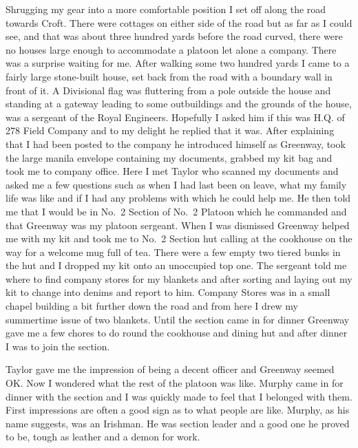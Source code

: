Shrugging my gear into a more comfortable position I set off along the
road towards Croft. There were cottages on either side of the road
but as far as I could see, and that was about three hundred yards
before the road curved, there were no houses large enough to accommodate
a platoon let alone a company. There was a surprise waiting for me.
After walking some two hundred yards I came to a fairly large
stone-built house, set back from the road with a boundary wall in front
of it. A Divisional flag was fluttering from a pole outside the house
and standing at a gateway leading to some outbuildings and the grounds
of the house, was a sergeant of the Royal Engineers. Hopefully I
asked him if this was H.Q. of 278 Field Company and to my delight he
replied that it was. After explaining that I had been posted to the
company he introduced himself as \sergeant Greenway, took the large
manila envelope containing my documents, grabbed my kit bag and took
me to company office. Here I met \lieutenant Taylor who scanned my
documents and asked me a few questions such as when I had last been on
leave, what my family life was like and if I had any problems with
which he could help me. He then told me that I would be in No.~2
Section of No.~2 Platoon which he commanded and that \sergeant
Greenway was my platoon sergeant. When I was dismissed \sergeant
Greenway helped me with my kit and took me to No.~2 Section hut
calling at the cookhouse on the way for a welcome mug full of tea.
There were a few empty two tiered bunks in the hut and I dropped my
kit onto an unoccupied top one. The sergeant told me where to find
company stores for my blankets and after sorting and laying out my kit
to change into denims and report to him. Company Stores was in a
small chapel building a bit further down the road and from here I drew
my summertime issue of two blankets. Until the section came in for
dinner \sergeant Greenway gave me a few chores to do round the
cookhouse and dining hut and after dinner I was to join the section.

\Lieutenant Taylor gave me the impression of being a decent officer and
\sergeant Greenway seemed OK. Now I wondered what the rest of the
platoon was like. \Corporal Murphy came in for dinner with the section
and I was quickly made to feel that I belonged with them. First
impressions are often a good sign as to what people are like. Murphy,
as his name suggests, was an Irishman. He was section leader and a
good one he proved to be, tough as leather and a demon for work.

